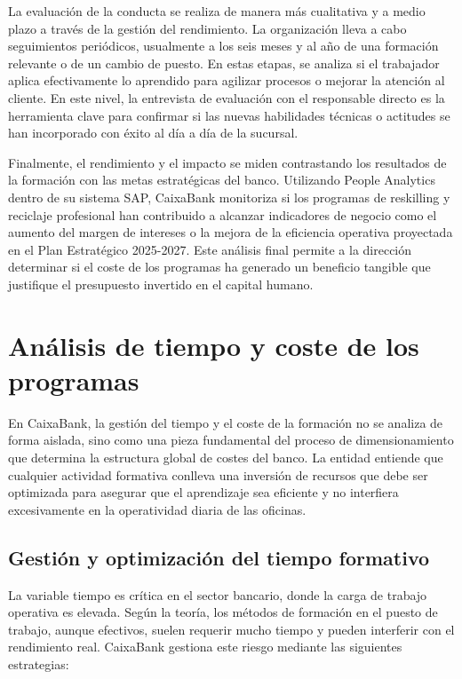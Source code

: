 La evaluación de la conducta se realiza de manera más cualitativa y a medio plazo a través de la gestión del rendimiento. La organización lleva a cabo seguimientos periódicos, usualmente a los seis meses y al año de una formación relevante o de un cambio de puesto. En estas etapas, se analiza si el trabajador aplica efectivamente lo aprendido para agilizar procesos o mejorar la atención al cliente. En este nivel, la entrevista de evaluación con el responsable directo es la herramienta clave para confirmar si las nuevas habilidades técnicas o actitudes se han incorporado con éxito al día a día de la sucursal.

Finalmente, el rendimiento y el impacto se miden contrastando los resultados de la formación con las metas estratégicas del banco. Utilizando People Analytics dentro de su sistema SAP, CaixaBank monitoriza si los programas de reskilling y reciclaje profesional han contribuido a alcanzar indicadores de negocio como el aumento del margen de intereses o la mejora de la eficiencia operativa proyectada en el Plan Estratégico 2025-2027. Este análisis final permite a la dirección determinar si el coste de los programas ha generado un beneficio tangible que justifique el presupuesto invertido en el capital humano.

\section{Análisis de tiempo y coste de los programas}

En CaixaBank, la gestión del tiempo y el coste de la formación no se analiza de forma aislada, sino como una pieza fundamental del proceso de dimensionamiento que determina la estructura global de costes del banco. La entidad entiende que cualquier actividad formativa conlleva una inversión de recursos que debe ser optimizada para asegurar que el aprendizaje sea eficiente y no interfiera excesivamente en la operatividad diaria de las oficinas.

\subsection{Gestión y optimización del tiempo formativo}

La variable tiempo es crítica en el sector bancario, donde la carga de trabajo operativa es elevada. Según la teoría, los métodos de formación en el puesto de trabajo, aunque efectivos, suelen requerir mucho tiempo y pueden interferir con el rendimiento real. CaixaBank gestiona este riesgo mediante las siguientes estrategias:

